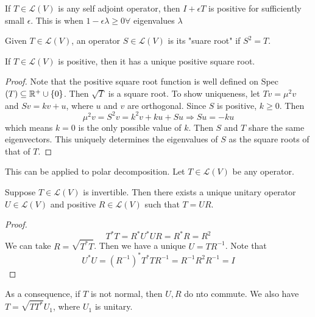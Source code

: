 \documentclass[12pt]{article}
\begin{document}
\begin{ex}
	If $T \in \mathcal L(V)$ is any self adjoint operator, then $I+\epsilon T$ is positive for sufficiently small $\epsilon$. This is when
	$1-\epsilon\lambda \geq 0 \forall$ eigenvalues $\lambda$
\end{ex}

Given $T \in \mathcal L(V)$, an operator $S \in \mathcal L(V)$ is its "suare root" if $S^2 = T$.

\begin{prop}
	If $T \in \mathcal L(V)$ is positive, then it has a unique positive square root.
\end{prop}

\begin{proof}
	Note that the positive square root function is well defined on Spec$(T) \subseteq \mathbb{R}^+\cup\{0\}$. Then $\sqrt{T}$ is a square root. To show uniqueness, let
	$Tv = \mu^2v$ and $Sv = kv + u$, where $u$ and $v$ are orthogonal. Since $S$ is positive, $k \geq 0$. Then
	$$\mu^2v = S^2v = k^2v + ku + Su \Rightarrow Su = -ku$$
	which means $k=0$ is the only possible value of $k$. Then $S$ and $T$ share the same eigenvectors. This uniquely determines the eigenvalues of $S$ as the square roots of that of $T$.
\end{proof}

This can be applied to polar decomposition. Let $T \in \mathcal L(V)$ be any operator.

\begin{thm}
	Suppose $T \in \mathcal L(V)$ is invertible. Then there exists a unique unitary operator $U \in \mathcal L(V)$ and positive $R \in \mathcal L(V)$ such that $T = UR$.
\end{thm}

\begin{proof}
	$$T^*T = R^*U^*UR = R^*R = R^2$$
	We can take $R = \sqrt{T^*T}$. Then we have a unique $U = TR^{-1}$. Note that
	$$U^*U = (R^{-1})^*T^*TR^{-1} = R^{-1}R^2R^{-1} = I$$
\end{proof}

As a consequence, if $T$ is not normal, then $U,R$ do nto commute. We also have $T = \sqrt{TT^*}U_1$, where $U_1$ is unitary.
\end{document}
